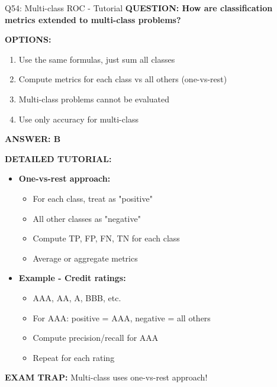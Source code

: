 \documentclass[8pt]{beamer}
\begin{document}
	\begin{frame}{Q54: Multi-class ROC - Tutorial}
		\fontsize{6.5}{7.5}\selectfont
		\textbf{QUESTION: How are classification metrics extended to multi-class problems?}
		
		\vspace{0.1cm}
		\textbf{OPTIONS:}
		\begin{enumerate}
			\item Use the same formulas, just sum all classes
			\item Compute metrics for each class vs all others (one-vs-rest)
			\item Multi-class problems cannot be evaluated
			\item Use only accuracy for multi-class
		\end{enumerate}
		
		\vspace{0.1cm}
		\textcolor{myblue}{\textbf{ANSWER: B}}
		
		\vspace{0.1cm}
		\textbf{DETAILED TUTORIAL:}
		\begin{itemize}
			\item \textbf{One-vs-rest approach:}
			\begin{itemize}
				\item For each class, treat as "positive"
				\item All other classes as "negative"
				\item Compute TP, FP, FN, TN for each class
				\item Average or aggregate metrics
			\end{itemize}
			\item \textbf{Example - Credit ratings:}
			\begin{itemize}
				\item AAA, AA, A, BBB, etc.
				\item For AAA: positive = AAA, negative = all others
				\item Compute precision/recall for AAA
				\item Repeat for each rating
			\end{itemize}
		\end{itemize}
		
		\textcolor{myred}{\textbf{EXAM TRAP:}} Multi-class uses \textcolor{myblue}{one-vs-rest} approach!
	\end{frame}
	
\end{document}
